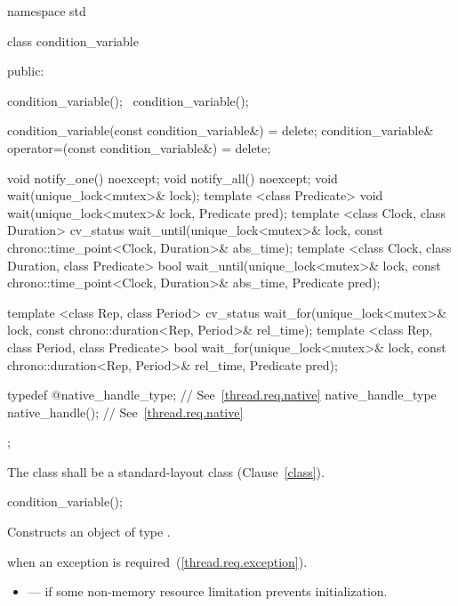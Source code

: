 \begin{codeblock}
namespace std {
  class condition_variable {
  public:

    condition_variable();
    ~condition_variable();

    condition_variable(const condition_variable&) = delete;
    condition_variable& operator=(const condition_variable&) = delete;

    void notify_one() noexcept;
    void notify_all() noexcept;
    void wait(unique_lock<mutex>& lock);
    template <class Predicate>
      void wait(unique_lock<mutex>& lock, Predicate pred);
    template <class Clock, class Duration>
      cv_status wait_until(unique_lock<mutex>& lock,
                           const chrono::time_point<Clock, Duration>& abs_time);
    template <class Clock, class Duration, class Predicate>
      bool wait_until(unique_lock<mutex>& lock,
                      const chrono::time_point<Clock, Duration>& abs_time,
                      Predicate pred);

    template <class Rep, class Period>
      cv_status wait_for(unique_lock<mutex>& lock,
                         const chrono::duration<Rep, Period>& rel_time);
    template <class Rep, class Period, class Predicate>
      bool wait_for(unique_lock<mutex>& lock,
                    const chrono::duration<Rep, Period>& rel_time,
                    Predicate pred);

    typedef @\impdef@ native_handle_type; // See~\ref{thread.req.native}
    native_handle_type native_handle();                // See~\ref{thread.req.native}
  };
}
\end{codeblock}

\pnum
The class  shall be a standard-layout class (Clause~\ref{class}).

%
\begin{itemdecl}
condition_variable();
\end{itemdecl}

\begin{itemdescr}
\pnum
\effects Constructs an object of type .

\pnum
\throws {} when an exception is required~(\ref{thread.req.exception}).

\pnum
\errors
\begin{itemize}
\item {} --- if some non-memory resource
limitation prevents initialization.
\end{itemize}
\end{itemdescr}

